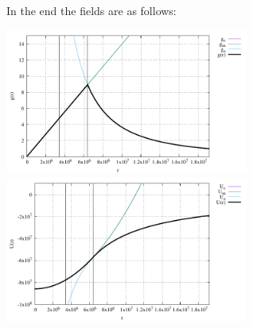 In the end the fields are as follows:
\begin{center}
\includegraphics[width=8cm]{images/gravity_benchmark2/g1.pdf}
\includegraphics[width=8cm]{images/gravity_benchmark2/U1.pdf}
\end{center}





